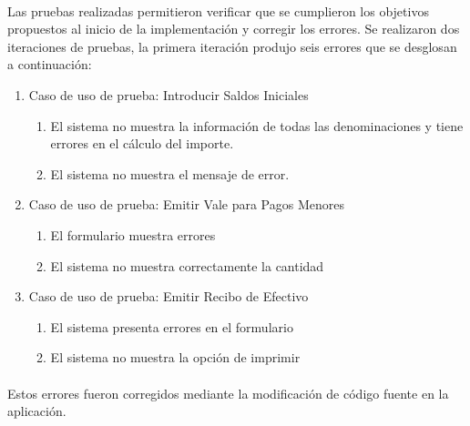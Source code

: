 \paragraph{}Las pruebas realizadas permitieron verificar que se cumplieron los objetivos propuestos al inicio de la implementación y corregir los errores. Se realizaron dos iteraciones de pruebas, la primera iteración produjo seis errores que se desglosan a continuación:
\begin{enumerate}
	\item Caso de uso de prueba: Introducir Saldos Iniciales
	\begin{enumerate}
		\item El sistema no muestra la información de todas las denominaciones y tiene errores en el cálculo del importe.
		\item El sistema no muestra el mensaje de error.
	\end{enumerate}
	\item Caso de uso de prueba: Emitir Vale para Pagos Menores
	\begin{enumerate}
		\item El formulario muestra errores
		\item El sistema no muestra correctamente la cantidad
	\end{enumerate}
	\item Caso de uso de prueba: Emitir Recibo de Efectivo
	\begin{enumerate}
		\item El sistema presenta errores en el formulario
		\item El sistema no muestra la opción de imprimir
	\end{enumerate}
\end{enumerate}

\paragraph{}Estos errores fueron corregidos mediante la modificación de código fuente en la aplicación.

